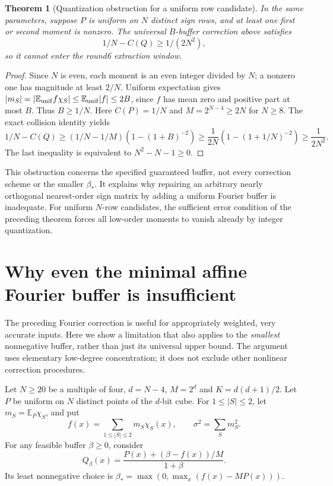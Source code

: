 \documentclass[11pt]{article}
\newtheorem{theorem}{Theorem}[section]
\begin{document}
\begin{theorem}[Quantization obstruction for a uniform row candidate]
In the same parameters, suppose $P$ is uniform on $N$ distinct sign
rows, and at least one first or second moment is nonzero. The universal
$B$-buffer correction above satisfies
\[
 1/N-C(Q)\ge1/(2N^2),
\]
so it cannot enter the round6 extraction window.
\end{theorem}
\begin{proof}
Since $N$ is even, each moment is an even integer divided by $N$;
a nonzero one has magnitude at least $2/N$. Uniform expectation
gives $|m_S|=|\mathbb E_{\rm unif} f\chi_S|
\le\mathbb E_{\rm unif}|f|\le2B$, since $f$ has mean zero
and positive part at most $B$. Thus $B\ge1/N$.
Here $C(P)=1/N$ and $M=2^{N-4}\ge2N$ for $N\ge8$.
The exact collision identity yields
\[
 1/N-C(Q)\ge(1/N-1/M)\left(1-(1+B)^{-2}\right)
 \ge\frac1{2N}\left(1-(1+1/N)^{-2}\right)
 \ge\frac1{2N^2}.
\]
The last inequality is equivalent to $N^2-N-1\ge0$.
\end{proof}
This obstruction concerns the specified guaranteed buffer, not every
correction scheme or the smaller $\beta_*$. It explains why repairing
an arbitrary nearly orthogonal nearest-order sign matrix by adding a
uniform Fourier buffer is inadequate. For uniform $N$-row candidates,
the sufficient error condition of the preceding theorem forces all
low-order moments to vanish already by integer quantization.
\section{Why even the minimal affine Fourier buffer is insufficient}
\label{sec:minimal-buffer-obstruction}
The preceding Fourier correction is useful for appropriately weighted,
very accurate inputs. Here we show a limitation that also applies to
the \emph{smallest} nonnegative buffer, rather than just its universal
upper bound. The argument uses elementary low-degree concentration;
it does not exclude other nonlinear correction procedures.

Let $N\ge20$ be a multiple of four, $d=N-4$, $M=2^d$ and
$K=d(d+1)/2$. Let $P$ be uniform on $N$ distinct points of the
$d$-bit cube. For $1\le|S|\le2$, let
$m_S=\mathbb E_P\chi_S$, and put
\[
 f(x)=\sum_{1\le|S|\le2}m_S\chi_S(x),\qquad
 \sigma^2=\sum_Sm_S^2.
\]
For any feasible buffer $\beta\ge0$, consider
\[
 Q_\beta(x)=\frac{P(x)+(\beta-f(x))/M}{1+\beta}.
\]
Its least nonnegative choice is
$\beta_* =\max(0,\max_x(f(x)-MP(x)))$.
\end{document}
